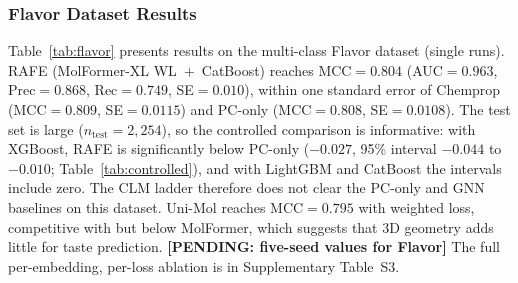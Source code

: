 \documentclass[pdflatex,sn-mathphys-num]{sn-jnl}%
\newcommand{\pending}[1]{{\color{red}\textbf{[PENDING: #1]}}}%
\begin{document}
\begin{table}[!ht]
\centering
\caption{Best performing configurations for each modality/baseline on BBBP. $^*$ denotes overall best by MCC. RAFE = FT~Embed~+~PC~+~ZINC-250k retrieval features. PC-only / Chemprop / GCN are run in-house on the identical split.}
\label{tab:bbbp}
\end{table}

\subsubsection{Flavor Dataset Results}
Table~\ref{tab:flavor} presents results on the multi-class Flavor dataset (single runs). RAFE (MolFormer-XL WL~$+$~CatBoost) reaches MCC$=0.804$ (AUC$=0.963$, Prec$=0.868$, Rec$=0.749$, SE$=0.010$), within one standard error of Chemprop (MCC$=0.809$, SE$=0.0115$) and PC-only (MCC$=0.808$, SE$=0.0108$). The test set is large ($n_\text{test}=2{,}254$), so the controlled comparison is informative: with XGBoost, RAFE is significantly below PC-only ($-0.027$, 95\% interval $-0.044$ to $-0.010$; Table~\ref{tab:controlled}), and with LightGBM and CatBoost the intervals include zero. The CLM ladder therefore does not clear the PC-only and GNN baselines on this dataset. Uni-Mol reaches MCC$=0.795$ with weighted loss, competitive with but below MolFormer, which suggests that 3D geometry adds little for taste prediction. \pending{five-seed values for Flavor} The full per-embedding, per-loss ablation is in Supplementary Table~S3.
\end{document}
